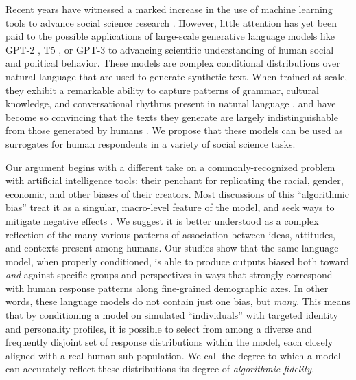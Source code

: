\documentclass[11pt]{article}
\begin{document}
Recent years have witnessed a marked increase in the use of machine learning tools to advance social science research \citep{rodriguez2021word, benoit2019measuring, barbera2021automated, rheault2020word, grimmer2021machine, greene2019machine}. However, little attention has yet been paid to the possible applications of large-scale generative language models like GPT-2 \citep{radford2019language}, T5 \citep{2020t5}, or GPT-3 \citep{brown2020language} to advancing scientific understanding of human social and political behavior. These models are complex conditional distributions over natural language that are used to generate synthetic text. When trained at scale, they exhibit a remarkable ability to capture patterns of grammar, cultural knowledge, and conversational rhythms present in natural language \citep{Meena, openaiGPT2, dai2019transformerxl}, and have become so convincing that the texts they generate are largely indistinguishable from those generated by humans \citep{brown2020language}. We propose that these models can be used as surrogates for human respondents in a variety of social science tasks.

Our argument begins with a different take on a commonly-recognized problem with artificial intelligence tools: their penchant for replicating the racial, gender, economic, and other biases of their creators.
Most discussions of this ``algorithmic bias'' treat it as a singular, macro-level feature of the model, and seek ways to mitigate negative effects \citep{panchArtificialIntelligenceAlgorithmic2019, maysonBiasBiasOut2018, barocasBigDataDisparate2016}. We suggest it is better understood as a complex reflection of the many various patterns of association between ideas, attitudes, and contexts present among humans. Our studies show that the same language model, when properly conditioned, is able to produce outputs biased both toward \textit{and} against specific groups and perspectives in ways that strongly correspond with human response patterns along fine-grained demographic axes. In other words, these language models do not contain just one bias, but \textit{many}. This means that by conditioning a model on simulated ``individuals'' with targeted identity and personality profiles, it is possible to select from among a diverse and frequently disjoint set of response distributions within the model, each closely aligned with a real human sub-population. We call the degree to which a model can accurately reflect these distributions its degree of \emph{algorithmic fidelity}.
\end{document}
